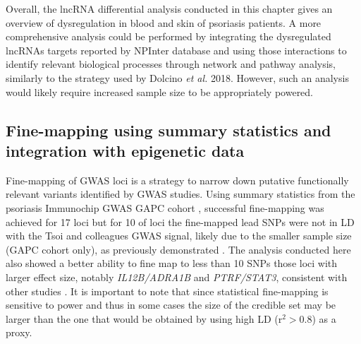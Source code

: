 Overall, the lncRNA differential analysis conducted in this chapter gives an overview of dysregulation in blood and skin of psoriasis patients. A more comprehensive analysis could be performed by integrating the dysregulated lncRNAs targets reported by NPInter database and  using those interactions to identify relevant biological processes through network and pathway analysis, similarly to the strategy used by Dolcino \textit{et al.} 2018. However, such an analysis would likely require increased sample size to be appropriately powered.



\subsection{Fine-mapping using summary statistics and integration with epigenetic data} 

Fine-mapping of GWAS loci is a strategy to narrow down putative functionally relevant variants identified by GWAS studies. Using summary statistics from the psoriasis Immunochip GWAS GAPC cohort  \parencite{Tsoi2012}, successful fine-mapping was achieved for 17 loci but for 10 of loci the fine-mapped lead SNPs were not in LD with the Tsoi and colleagues GWAS signal, likely due to the smaller sample size (GAPC cohort only), as previously demonstrated \parencite{Bunt2015}. The analysis conducted here also showed a better ability to fine map to less than 10 SNPs those loci with larger effect size, notably \textit{IL12B/ADRA1B} and \textit{PTRF/STAT3}, consistent with other studies \parencite{Bunt2015}. It is important to note that since statistical fine-mapping is sensitive to power and thus in some cases the size of the credible set may be larger than the one that would be obtained by using high LD (r$^{2}>$0.8) as a proxy. %

